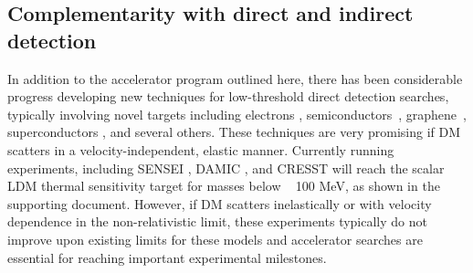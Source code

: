 \documentclass[../report.tex]{subfiles}
\begin{document}


\subsection{Complementarity with direct and indirect detection}

In addition to the accelerator program outlined here, there has been considerable progress developing new techniques for low-threshold direct detection searches, typically involving novel targets including electrons \cite{Essig:2011nj}, semiconductors~\cite{Essig:2015cda}, graphene~\cite{Hochberg:2016ntt}, superconductors \cite{Hochberg:2015fth}, and several others. These techniques are very promising if DM scatters in a velocity-independent, elastic manner. Currently running experiments, including SENSEI \cite{Tiffenberg:2017aac}, DAMIC \cite{Aguilar-Arevalo:2019wdi}, and CRESST \cite{Petricca:2017zdp} 
will reach the scalar LDM thermal sensitivity target for masses below ~ 100 MeV, as shown in the supporting document. However, if DM scatters inelastically or with velocity dependence in the non-relativistic limit, these experiments typically do not improve upon existing limits for these models and accelerator searches are essential for reaching important experimental milestones.
\end{document}
